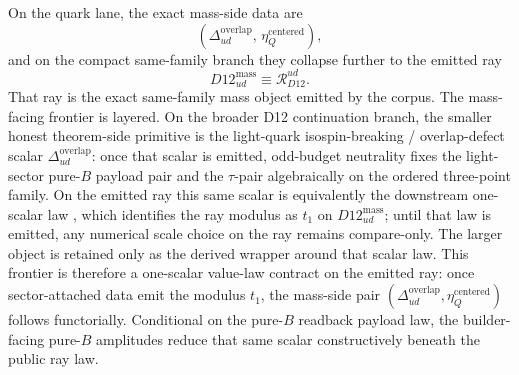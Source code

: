 On the quark lane, the exact mass-side data are
\[
(\Delta_{ud}^{\mathrm{overlap}},\,\eta_Q^{\mathrm{centered}}),
\]
and on the compact same-family branch they collapse further to the emitted ray
\[
D12_{ud}^{\mathrm{mass}}
\equiv
\mathcal R_{D12}^{ud}.
\]
That ray is the exact same-family mass object emitted by the corpus. The mass-facing frontier is layered. On the broader D12 continuation branch, the smaller honest theorem-side primitive is the light-quark isospin-breaking / overlap-defect scalar \(\Delta_{ud}^{\mathrm{overlap}}\): once that scalar is emitted, odd-budget neutrality fixes the light-sector pure-\(B\) payload pair and the \(\tau\)-pair algebraically on the ordered three-point family. On the emitted ray this same scalar is equivalently the downstream one-scalar law , which identifies the ray modulus as \(t_1\) on \(D12_{ud}^{\mathrm{mass}}\); until that law is emitted, any numerical scale choice on the ray remains compare-only. The larger object  is retained only as the derived wrapper around that scalar law.
This frontier is therefore a one-scalar value-law contract on the emitted ray: once sector-attached data emit the modulus \(t_1\), the mass-side pair \((\Delta_{ud}^{\mathrm{overlap}},\eta_Q^{\mathrm{centered}})\) follows functorially. Conditional on the pure-\(B\) readback payload law, the builder-facing pure-\(B\) amplitudes reduce that same scalar constructively beneath the public ray law.

